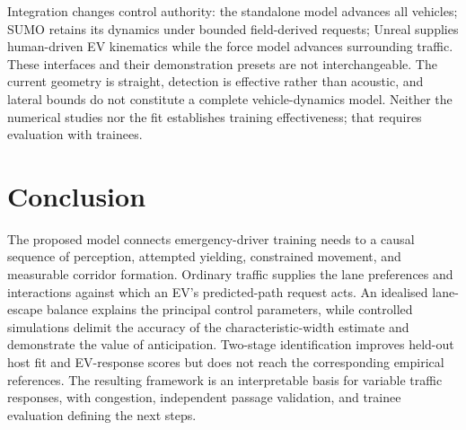 \documentclass[conference,a4paper]{IEEEtran}
\begin{document}
Integration changes control authority: the standalone model advances all vehicles; SUMO retains its dynamics under bounded field-derived requests; Unreal supplies human-driven EV kinematics while the force model advances surrounding traffic. These interfaces and their demonstration presets are not interchangeable. The current geometry is straight, detection is effective rather than acoustic, and lateral bounds do not constitute a complete vehicle-dynamics model. Neither the numerical studies nor the fit establishes training effectiveness; that requires evaluation with trainees.

\section{Conclusion}
The proposed model connects emergency-driver training needs to a causal sequence of perception, attempted yielding, constrained movement, and measurable corridor formation. Ordinary traffic supplies the lane preferences and interactions against which an EV's predicted-path request acts. An idealised lane-escape balance explains the principal control parameters, while controlled simulations delimit the accuracy of the characteristic-width estimate and demonstrate the value of anticipation. Two-stage identification improves held-out host fit and EV-response scores but does not reach the corresponding empirical references. The resulting framework is an interpretable basis for variable traffic responses, with congestion, independent passage validation, and trainee evaluation defining the next steps.
\end{document}
